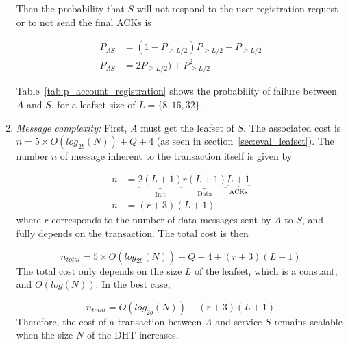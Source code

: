 \begin{enumerate}

    Then the probability that $S$ will not respond to the user registration
request or to not send the final ACKs is

    \begin{align}
      P_{AS} &= (1- P_{\ge L/2}) P_{\ge L/2} +  P_{\ge L/2} \\
      P_{AS} &= 2P_{\ge L/2}) + P^2_{\ge L/2}
    \end{align}


    Table~\eqref{tab:p_account_registration} shows the probability of failure
between $A$ and $S$, for a leafset size of $L = \{8,16,32\}$.

    
    \item{\textit{Message complexity:}}
    First, $A$ must get the leafset of $S$. The associated cost is $n = 5
\times O(log_{2b}(N)) + Q + 4$ (as seen in section~\ref{sec:eval_leafset}).
    The number $n$ of message inherent to the transaction itself is given by

    \begin{align}
      n &= \underbrace{2(L+1)}_\text{Init} \underbrace{r(L+1)}_\text{Data} \underbrace{L+1}_\text{ACKs}\\
      n &= (r+3)(L+1)
    \end{align}
    where $r$ corresponds to the number of data messages sent by $A$ to $S$,
and fully depends on the transaction. The total cost is then

    $$
      n_{total} = 5 \times O(log_{2b}(N)) + Q + 4 + (r+3)(L+1)
    $$    
    The total cost only depends on the size $L$ of the leafset, which is a
constant, and $O(log(N))$. In the best case, 

    $$
      n_{total} = O(log_{2b}(N)) + (r+3)(L+1)
    $$
    Therefore, the cost of a transaction between $A$ and service $S$ remains
scalable when the size $N$ of the DHT increases.

  \end{enumerate}

